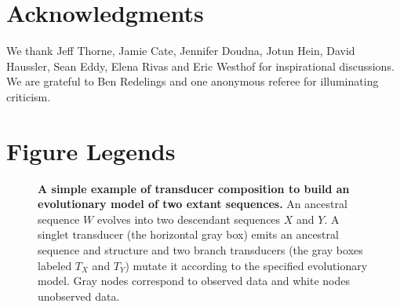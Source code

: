 \documentclass[10pt]{article}
\begin{document}










\newpage
\section*{Acknowledgments}

We thank
Jeff Thorne,
Jamie Cate,
Jennifer Doudna,
Jotun Hein,
David Haussler,
Sean Eddy,
Elena Rivas and
Eric Westhof
for inspirational discussions.
We are grateful to Ben Redelings and one anonymous referee for illuminating criticism.




\clearpage
\section*{Figure Legends}

\begin{figure}[!ht]
  \centering
   \caption{
     \textbf{A simple example of transducer composition to build an
       evolutionary model of two extant sequences.}
    An ancestral sequence $W$ evolves into two descendant sequences $X$ and $Y$.
     A singlet transducer (the horizontal gray box) emits an ancestral sequence and structure
     and two branch transducers (the gray boxes labeled $T_X$ and $T_Y$)
     mutate it according to the specified evolutionary model.
     Gray nodes correspond to observed data and white nodes unobserved data.
   }
 \end{figure}
 
\end{document}
